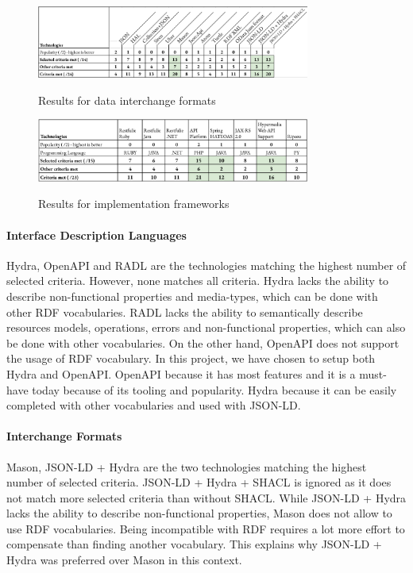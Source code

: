 \begin{figure}[ht]
\caption{Results for data interchange formats}
\centering
\includegraphics[width=0.8\textwidth]{figures/example-dif-results.png}
\label{example-dif-results}
\vspace*{-0.5cm}
\end{figure}

\begin{figure}[ht]
\caption{Results for implementation frameworks}
\centering
\includegraphics[width=0.8\textwidth]{figures/example-frameworks-results.png}
\label{example-frameworks-results}
\vspace*{-0.3cm}
\end{figure}

\paragraph{Interface Description Languages}
Hydra, OpenAPI and RADL are the technologies matching the highest number of selected criteria. However, none matches all criteria. Hydra lacks the ability to describe non-functional properties and media-types, which can be done with other RDF vocabularies. RADL lacks the ability to semantically describe resources models, operations, errors and non-functional properties, which can also be done with other vocabularies. On the other hand, OpenAPI does not support the usage of RDF vocabulary. 
In this project, we have chosen to setup both Hydra and OpenAPI. OpenAPI because it has most features and it is a must-have today because of its tooling and popularity. Hydra because it can be easily completed with other vocabularies and used with JSON-LD.

\paragraph{Interchange Formats}
Mason, JSON-LD + Hydra are the two technologies matching the highest number of selected criteria. JSON-LD + Hydra + SHACL is ignored as it does not match more selected criteria than without SHACL. While JSON-LD + Hydra lacks the ability to describe non-functional properties, Mason does not allow to use RDF vocabularies. Being incompatible with RDF requires a lot more effort to compensate than finding another vocabulary. This explains why JSON-LD + Hydra was preferred over Mason in this context.

